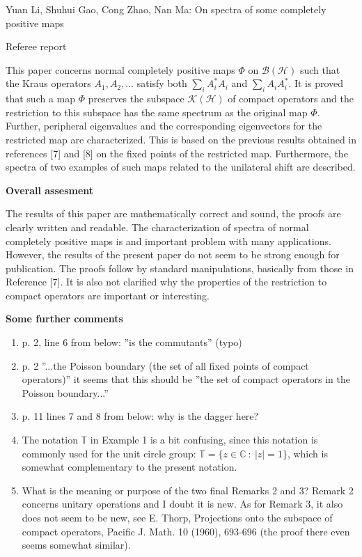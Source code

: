 \documentclass[12pt]{article}
\begin{document}
\begin{center}
{\large  Yuan Li, Shuhui Gao, Cong Zhao, Nan Ma: On spectra of some completely positive maps }

\end{center}
\medskip

\centerline{Referee report}

\bigskip


This paper concerns normal completely positive maps $\Phi$ on $\mathcal B(\mathcal H)$ such that
the Kraus operators  $A_1,A_2,\dots$ satisfy both  $\sum_i A_i^*A_i$ and $\sum_i
A_iA_i^*$. It is proved that such a map $\Phi$  preserves the subspace $\mathcal
K(\mathcal H)$ of compact operators and the restriction to this subspace has the same
spectrum as the original map $\Phi$.  Further, peripheral eigenvalues and the
corresponding eigenvectors for the restricted map are characterized. This is based on the
previous results obtained in references [7] and [8] on the fixed points of the restricted
map. Furthermore, the spectra of two examples of such maps related to the unilateral shift
are described.



\bigskip
\noindent
\textbf{Overall assesment}

\medskip
The results of this paper are mathematically correct and sound, the proofs are clearly
written and readable. The characterization of spectra of normal completely
positive maps is and important problem with many applications. However, the results of the
present paper do not seem to be strong enough for publication. The proofs follow by
standard manipulations, basically from those in Reference  [7].  It is
also not clarified why the properties of the restriction to compact operators are
important or interesting. 


\bigskip
\noindent
\textbf{Some further comments}
\begin{enumerate}
\item p. 2, line 6 from below: ''is the commutants'' (typo)
\item p. 2 ''...the Poisson boundary (the set of all fixed points of compact operators)''
it seems that this should be ''the set of compact operators in the Poisson boundary...''
\item p. 11 lines 7 and 8 from below: why is the dagger here?
\item The notation $\mathbb T$ in Example 1 is a bit confusing, since this notation is
commonly used for the unit circle group: $\mathbb T=\{z\in \mathbb C\ :\ |z|=1\}$, which
is somewhat complementary to the present notation.
\item What is the meaning or purpose of the two final Remarks 2 and 3? Remark 2 concerns
unitary operations and I doubt it is new. As for Remark 3, it also does not seem to be
new, see E. Thorp, Projections onto the subspace of compact operators, Pacific J. Math. 10
(1960), 693-696 (the proof there even seems somewhat similar).





\end{enumerate}
\end{document}
